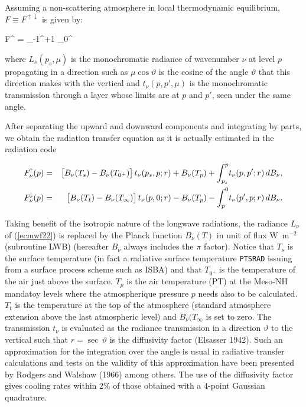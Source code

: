 %

Assuming a non-scattering atmosphere in local thermodynamic equilibrium,
$F \equiv F^{\!\uparrow\!\downarrow}$ is given by:

\medskip
\be
F^{\!\uparrow\!\downarrow} = \int_{-1}^{+1} \int_0^
\label{ecmwf22}
\ee
\medskip

where $L_{\nu}(p_s,\mu)$ is the monochromatic radiance of wavenumber
$\nu$ at level $p$ propagating in a direction such as $\mu \cos\vartheta $ is the cosine of the angle
$\vartheta $ that this direction makes with the vertical and
$t_{\nu}(p,p',\mu)$ is the monochromatic transmission through a layer
whose limits are at $p$ and $p'$, seen under the same angle.

After separating the upward and downward components and integrating by parts,
we obtain the radiation transfer equation as it is actually estimated in the
radiation code


\medskip
\begin{eqnarray}\label{ecmwf23}
F_{\nu}^{\!\uparrow}(p) &=&
\bigl[B_{\nu}(T_s) - B_{\nu}(T_{0^{+}})\bigr] \, t_{\nu}(p_s,p;r)
+ B_{\nu}(T_p) + \int_{p_s}^p \! {t_{\nu}(p,p';r) \, dB_{\nu}}, \cr
F_{\nu}^{\!\downarrow}(p) &=&
\bigl[B_{\nu}(T_t) - B_{\nu}(T_{\infty})\bigr] \, t_{\nu}(p,0;r)
- B_{\nu}(T_p) - \int_{p}^0 \! {t_{\nu}(p',p;r) \, dB_{\nu}}.
\end{eqnarray}
\medskip

Taking benefit of the isotropic nature of the longwave radiations,
the radiance $L_{\nu}$ of (\ref{ecmwf22}) is replaced by the Planck function
$B_{\nu}(T)$ in unit of flux W~m$^{-2}$ (subroutine LWB) (hereafter
$B_{\nu}$ always includes the $\pi$ factor).  Notice that $T_s$ is the surface
temperature (in fact a radiative surface temperature {\tt PTSRAD} issuing from
a surface process scheme such as ISBA) and that $T_{0^{+}}$ is the temperature
of the air just above the surface. $T_{p}$ is the air temperature (PT) at the
Meso-NH mandatoy levels where the atmospherique pressure $p$ needs also
to be calculated. $T_t$ is the temperature at the top of the atmosphere
(standard atmosphere extension above the last atmospheric level) and
$B_{\nu}(T_{\infty}$ is set to zero. The transmission $t_{\nu}$ is evaluated as
the radiance transmission in a direction $\vartheta $ to the vertical such
that $r = \sec \, \vartheta $ is the diffusivity factor (Elsasser 1942).
Such an approximation for the integration over the angle is usual in
radiative transfer calculations and tests on the validity of this
approximation have been presented by Rodgers and Walshaw (1966) among
others.  The use of the diffusivity factor gives cooling rates within
2\% of those obtained with a 4-point Gaussian quadrature.

